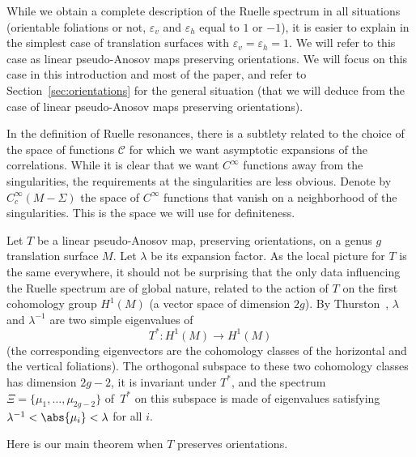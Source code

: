 \documentclass[JEP,XML,SOM,Unicode]{cedram}
\newcommand{\boC}{\mathcal{C}}
\let\epsilon\varepsilon
\theoremstyle{definition}
\numberwithin{equation}{section}
\begin{document}
While we obtain a complete description of the Ruelle spectrum in all
situations (orientable foliations or not, $\epsilon_v$ and $\epsilon_h$ equal
to $1$ or $-1$), it is easier to explain in the simplest case of translation
surfaces with $\epsilon_v = \epsilon_h = 1$. We will refer to this case as
linear pseudo-Anosov maps preserving orientations. We will focus on this case
in this introduction and most of the paper, and refer to
Section~\ref{sec:orientations} for the general situation (that we will deduce from the
case of linear pseudo-Anosov maps preserving orientations).

In the definition of Ruelle resonances, there is a subtlety related to the
choice of the space of functions $\boC$ for which we want asymptotic
expansions of the correlations. While it is clear that we want $C^\infty$
functions away from the singularities, the requirements at the singularities
are less obvious. Denote by $C^\infty_c(M-\Sigma)$ the space of $C^\infty$
functions that vanish on a neighborhood of the singularities. This is the
space we will use for definiteness.

Let $T$ be a linear pseudo-Anosov map, preserving orientations, on a genus
$g$ translation surface $M$. Let $\lambda$ be its expansion factor. As the
local picture for $T$ is the same everywhere, it should not be surprising
that the only data influencing the Ruelle spectrum are of global nature,
related to the action of $T$ on the first cohomology group $H^1(M)$ (a vector
space of dimension $2g$). By Thurston~\cite{thurston_pseudo_anosov},
$\lambda$ and $\lambda^{-1}$ are two simple eigenvalues of
\[
T^* : H^1(M)\to
H^1(M)
\]
(the corresponding eigenvectors are the cohomology classes of the
horizontal and the vertical foliations). The orthogonal subspace to these two
cohomology classes has dimension $2g-2$, it is invariant under $T^*$, and the
spectrum $\Xi = \{\mu_1,\dotsc,\mu_{2g-2}\}$ of~$T^*$ on this subspace is
made of eigenvalues satisfying $\lambda^{-1} < \abs{\mu_i} < \lambda$ for all
$i$.

Here is our main theorem when $T$ preserves orientations.
\end{document}
